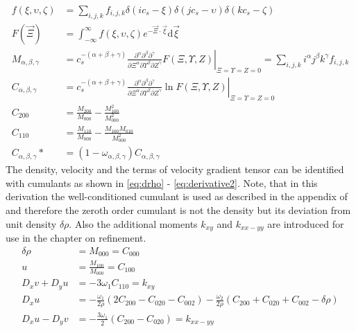 \begin{align}
f(\xi, \upsilon, \zeta) &= \sum_{i,j,k} f_{i,j,k} \delta(ic_s - \xi) \delta(jc_s - \upsilon) \delta(kc_s - \zeta) \label{eq:contin}\\
F(\vec{\Xi}) &= \int_{-\infty}^{\infty}f(\xi, \upsilon, \zeta)e^{-\vec{\Xi} \cdot \vec{\xi}} \mathrm{d}\vec{\xi} \label{eq:cum_laplace} \\
M_{\alpha, \beta, \gamma} &= c_s^{-(\alpha+\beta+\gamma)} \left. \frac{\partial^\alpha \partial^\beta \partial^\gamma}{\partial \Xi^\alpha \partial \Upsilon^\beta \partial Z^\gamma} F(\Xi, \Upsilon, Z) \right|_{\Xi=\Upsilon=Z=0} = \sum_{i,j,k} i^\alpha j^\beta k^\gamma f_{i,j,k} \label{eq:moments}\\
C_{\alpha,\beta,\gamma} &= c_s^{-(\alpha+\beta+\gamma)} \left. \frac{\partial^\alpha \partial^\beta \partial^\gamma}{\partial \Xi^\alpha \partial \Upsilon^\beta \partial Z^\gamma} \ln F(\Xi, \Upsilon, Z)\right|_{\Xi=\Upsilon=Z=0} \label{eq:cum} \\
C_{200} &= \frac{M_{200}}{M_{000}} - \frac{M_{100}^2}{M_{000}^2} \label{eq:c_200}\\
C_{110} &= \frac{M_{110}}{M_{000}} - \frac{M_{100} M_{010}}{M_{000}^2} \label{eq:c_110} \\
C_{\alpha, \beta, \gamma}* &= \left(1-\omega_{\alpha,\beta,\gamma}\right) C_{\alpha, \beta, \gamma} \label{eq:relax}
\end{align}
The density, velocity and the terms of velocity gradient tensor can be identified with cumulants as shown in \eqref{eq:drho} - \eqref{eq:derivative2}. Note, that in this derivation the well-conditioned cumulant is used as described in the appendix of \cite{geier_cumulant_2015} and therefore the zeroth order cumulant is not the density but its deviation from unit density $\delta \rho$. Also the additional moments $k_{xy}$ and $k_{xx-yy}$ are introduced for use in the chapter on refinement.
\begin{align}
\delta \rho &= M_{000} = C_{000} \label{eq:drho}\\
u &= \frac{M_{100}}{M_{000}} =  C_{100}\\
D_x v + D_y u &= -3 \omega_1 C_{110} = k_{xy} \label{eq:derivate1}\\
D_x u &= - \frac{\omega_1}{2 \rho}\left(2 C_{200} - C_{020} - C_{002} \right) - \frac{\omega_2}{2 \rho} \left(C_{200} + C_{020} + C_{002} - \delta \rho \right) \\
D_x u - D_y v &= - \frac{3\omega_1}{2} \left(C_{200} - C_{020}\right) = k_{xx-yy}\label{eq:derivative2}
\end{align}
